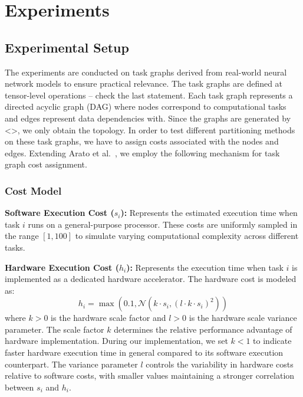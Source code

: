 \section{Experiments}

\subsection{Experimental Setup}

The experiments are conducted on task graphs derived from real-world neural network models to ensure practical relevance. The task graphs are defined at tensor-level operations -- check the last statement. Each task graph represents a directed acyclic graph (DAG) where nodes correspond to computational tasks and edges represent data dependencies with. Since the graphs are generated by <>, we only obtain the topology. In order to test different partitioning methods on these task graphs, we have to assign costs associated with the nodes and edges. Extending Arato et al.~\cite{arato2005algorithmic}, we employ the following mechanism for task graph cost assignment.

\subsubsection{Cost Model}


\textbf{Software Execution Cost ($s_i$):} Represents the estimated execution time when task $i$ runs on a general-purpose processor. These costs are uniformly sampled in the range $[1, 100]$ to simulate varying computational complexity across different tasks.

\textbf{Hardware Execution Cost ($h_i$):} Represents the execution time when task $i$ is implemented as a dedicated hardware accelerator. The hardware cost is modeled as:
\begin{equation}
h_i = \max(0.1, \mathcal{N}(k \cdot  s_i, (l \cdot k \cdot s_i)^2))
\end{equation}
where $k > 0$ is the hardware scale factor and $l > 0$ is the hardware scale variance parameter. The scale factor $k$ determines the relative performance advantage of hardware implementation. During our implementation, we set $k < 1$ to indicate faster hardware execution time in general compared to its software execution counterpart. The variance parameter $l$ controls the variability in hardware costs relative to software costs, with smaller values maintaining a stronger correlation between $s_i$ and $h_i$.

